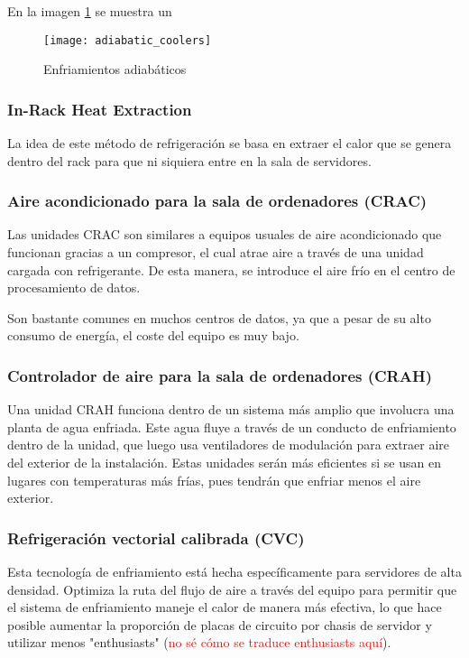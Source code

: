 En la imagen \ref{adiabatic_coolers} se muestra un 
\begin{figure}
    \begin{center}
    \caption{Enfriamientos adiabáticos}
    \label{adiabatic_coolers}
    \texttt{[image: adiabatic\_coolers]}
    \end{center}
\end{figure}

\subsubsection{In-Rack Heat Extraction}

La idea de este método de refrigeración se basa en extraer el calor que se genera dentro del rack para que ni siquiera entre en la sala de servidores.

\subsubsection{Aire acondicionado para la sala de ordenadores (CRAC)}

Las unidades CRAC son similares a equipos usuales de aire acondicionado que funcionan gracias a un compresor, el cual atrae aire a través de una unidad cargada con refrigerante. De esta manera, se introduce el aire frío en el centro de procesamiento de datos.

Son bastante comunes en muchos centros de datos, ya que a pesar de su alto consumo de energía, el coste del equipo es muy bajo.

\subsubsection{Controlador de aire para la sala de ordenadores (CRAH)}

Una unidad CRAH funciona dentro de un sistema más amplio que involucra una planta de agua enfriada. Este agua fluye a través de un conducto de enfriamiento dentro de la unidad, que luego usa ventiladores de modulación para extraer aire del exterior de la instalación. Estas unidades serán más eficientes si se usan en lugares con temperaturas más frías, pues tendrán que enfriar menos el aire exterior.

\subsubsection{Refrigeración vectorial calibrada (CVC)}

Esta tecnología de enfriamiento está hecha específicamente para servidores de alta densidad. Optimiza la ruta del flujo de aire a través del equipo para permitir que el sistema de enfriamiento maneje el calor de manera más efectiva, lo que hace posible aumentar la proporción de placas de circuito por chasis de servidor y utilizar menos "enthusiasts" (\textcolor{red}{no sé cómo se traduce enthusiasts aquí}).

